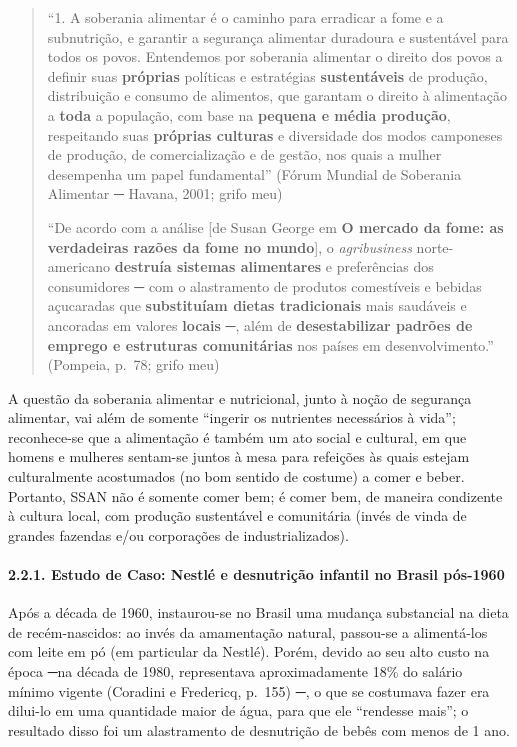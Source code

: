 \documentclass[12pt]{article}
\numberwithin{equation}{section}
\theoremstyle{plain}
\theoremstyle{definition}
\theoremstyle{remark}
\begin{document}
\begin{quote}
``1. A soberania alimentar é o caminho para erradicar a fome e a subnutrição, e garantir a segurança alimentar duradoura e sustentável para todos os povos. Entendemos por soberania alimentar o direito dos povos a definir suas \textbf{próprias} políticas e estratégias \textbf{sustentáveis} de produção, distribuição e consumo de alimentos, que garantam o direito à alimentação a \textbf{toda} a população, com base na \textbf{pequena e média produção}, respeitando suas \textbf{próprias culturas} e diversidade dos modos camponeses de produção, de comercialização e de gestão, nos quais a mulher desempenha um papel fundamental'' (Fórum Mundial de Soberania Alimentar ─ Havana, 2001; grifo meu)

``De acordo com a análise {[}de Susan George em \textbf{O mercado da fome: as verdadeiras razões da fome no mundo}{]}, o \textit{agribusiness} norte-americano \textbf{destruía sistemas alimentares} e preferências dos consumidores ─ com o alastramento de produtos comestíveis e bebidas açucaradas que \textbf{substituíam dietas tradicionais} mais saudáveis e ancoradas em valores \textbf{locais} ─, além de \textbf{desestabilizar padrões de emprego e estruturas comunitárias} nos países em desenvolvimento.'' (Pompeia, p.~78; grifo meu)
\end{quote}

A questão da soberania alimentar e nutricional, junto à noção de segurança alimentar, vai além de somente ``ingerir os nutrientes necessários à vida''; reconhece-se que a alimentação é também um ato social e cultural, em que homens e mulheres sentam-se juntos à mesa para refeições às quais estejam culturalmente acostumados (no bom sentido de costume) a comer e beber. Portanto, SSAN não é somente comer bem; é comer bem, de maneira condizente à cultura local, com produção sustentável e comunitária (invés de vinda de grandes fazendas e/ou corporações de industrializados).

\hypertarget{estudo-de-caso-nestluxe9-e-desnutriuxe7uxe3o-infantil-no-brasil-puxf3s-1960}{%
\paragraph{2.2.1. Estudo de Caso: Nestlé e desnutrição infantil no Brasil pós-1960}\label{estudo-de-caso-nestluxe9-e-desnutriuxe7uxe3o-infantil-no-brasil-puxf3s-1960}}

Após a década de 1960, instaurou-se no Brasil uma mudança substancial na dieta de recém-nascidos: ao invés da amamentação natural, passou-se a alimentá-los com leite em pó (em particular da Nestlé). Porém, devido ao seu alto custo na época ─na década de 1980, representava aproximadamente 18\% do salário mínimo vigente (Coradini e Fredericq, p.~155) ─, o que se costumava fazer era dilui-lo em uma quantidade maior de água, para que ele ``rendesse mais''; o resultado disso foi um alastramento de desnutrição de bebês com menos de 1 ano.
\end{document}
